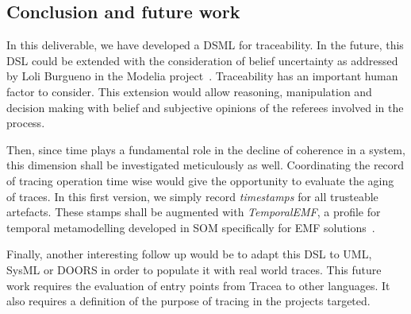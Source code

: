 






\subsection{Conclusion and future work}
In this deliverable, we have developed a DSML for traceability. 
In the future, this DSL could be extended with the consideration of belief uncertainty as addressed by Loli Burgueno in the Modelia project~\cite{burgueno2019-uncertainty}. Traceability has an important human factor to consider. This extension would allow reasoning, manipulation and decision making with belief and subjective opinions of the referees involved in the process.

Then, since time plays a fundamental role in the decline of coherence in a system, this dimension shall be investigated meticulously as well. Coordinating the record of tracing operation time wise would give the opportunity to evaluate the aging of traces. In this first version, we simply record \textit{timestamps} for all trusteable artefacts. These stamps shall be augmented with \textit{TemporalEMF}, a profile for temporal metamodelling developed in SOM specifically for EMF solutions~\cite{gomez2018-temporalEMF}.  

Finally, another interesting follow up would be to adapt this DSL to UML, SysML or DOORS in order to populate it with real world traces. This future work requires the evaluation of entry points from Tracea to other languages. It also requires a definition of the purpose of tracing in the projects targeted.

